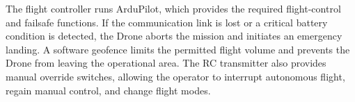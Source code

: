 %

The flight controller runs ArduPilot, which provides the required flight-control 
and failsafe functions. If the communication link is lost or a critical battery 
condition is detected, the Drone aborts the mission and initiates an emergency landing. 
A software geofence limits the permitted flight volume and prevents the Drone from 
leaving the operational area. The RC transmitter also provides manual override switches, 
allowing the operator to interrupt autonomous flight, regain manual control, and change flight modes.